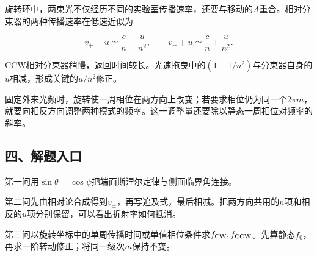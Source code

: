 \documentclass[12pt,a4paper,fontset=fandol]{ctexart}
\begin{document}
旋转环中，两束光不仅经历不同的实验室传播速率，还要与移动的\(A\)重合。相对分束器的两种传播速率在低速近似为

\[
v_+-u\simeq\frac cn-\frac{u}{n^2},
\qquad
v_-+u\simeq\frac cn+\frac{u}{n^2}.
\]

CCW相对分束器稍慢，返回时间较长。光速拖曳中的\((1-1/n^2)\)与分束器自身的\(u\)相减，形成关键的\(u/n^2\)修正。

\begin{center}
\begin{minipage}{\linewidth}
\centering\begingroup{}
\ifdim\wd\diagrambox>.88\linewidth
\sbox{\diagrambox}{\resizebox{.88\linewidth}{!}{\usebox{\diagrambox}}}\fi
\ifdim\ht\diagrambox>.38\textheight
\resizebox{!}{.38\textheight}{\usebox{\diagrambox}}
\else\usebox{\diagrambox}\fi
\par{}\endgroup\end{minipage}\end{center}

固定外来光频时，旋转使一周相位在两方向上改变；若要求相位仍为同一个\(2\pi m\)，就要向相反方向调整两种模式的频率。这一调整量还要除以静态一周相位对频率的斜率。

\subsection{四、解题入口}\label{ux56dbux89e3ux9898ux5165ux53e3-5}

第一问用\(\sin\theta=\cos\psi\)把端面斯涅尔定律与侧面临界角连接。

第二问先由相对论合成得到\(v_\pm\)，再写追及式，最后相减。把两方向共用的\(n\)项和相反的\(u\)项分别保留，可以看出折射率如何抵消。

第三问以旋转坐标中的单周传播时间或单值相位条件求\(f_{\rm CW},f_{\rm CCW}\)。先算静态\(f_0\)，再求一阶转动修正；将同一级次\(m\)保持不变。
\end{document}
